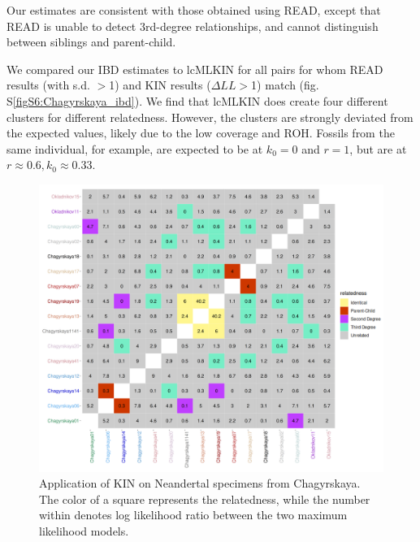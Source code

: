 \documentclass[12pt, letterpaper]{article}
\begin{document}
Our estimates are consistent with those obtained using READ, except that READ is unable to detect 3rd-degree relationships, and cannot distinguish between siblings and parent-child.

We compared our IBD estimates to lcMLKIN for all pairs for whom READ results (with s.d. $>$1) and KIN results ($\Delta LL>$1) match (fig. S\ref{figS6:Chagyrskaya_ibd}).  We find that lcMLKIN does create four different clusters for different relatedness. However, the clusters are strongly deviated from the expected values, likely due to the low coverage and ROH.  Fossils from the same individual, for example, are expected to be at $k_0 = 0$ and $r = 1$, but are at $r \approx 0.6, k_0 \approx 0.33$.


\begin{figure}[h!]
    \includegraphics[width=18cm]{plots/inkscape_finalImg/kinplot.png}
    \centering
    \caption{Application of KIN on Neandertal specimens from Chagyrskaya. The color of a square represents the relatedness, while the number within denotes log likelihood ratio between the two maximum likelihood models.}
    \label{fig5:Chagyrskaya_KIN}
\end{figure}
\end{document}
